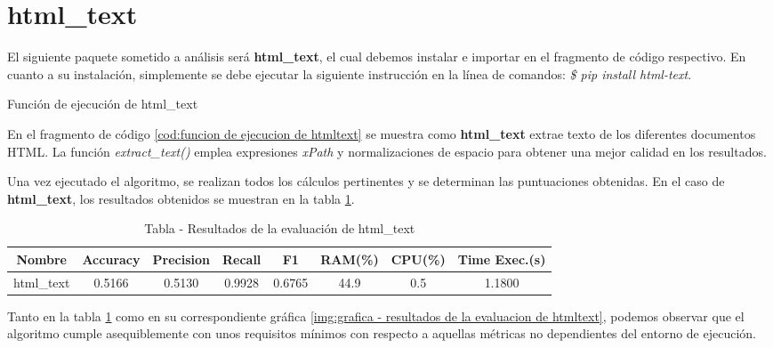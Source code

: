 \section*{html\_text}

El siguiente paquete sometido a análisis será \textbf{html\_text}, el cual debemos instalar e importar en 
el fragmento de código respectivo. En cuanto a su instalación, simplemente se debe ejecutar la siguiente 
instrucción en la línea de comandos: \emph{\$ pip install html-text}.

\begin{codefloat}
    
    \caption{Función de ejecución de html\_text}
    \label{cod:funcion de ejecucion de htmltext}
\end{codefloat}

En el fragmento de código \ref{cod:funcion de ejecucion de htmltext} se muestra como \textbf{html\_text} 
extrae texto de los diferentes documentos HTML. La función \emph{extract\_text()} emplea expresiones 
\emph{xPath} y normalizaciones de espacio para obtener una mejor calidad en los resultados.

Una vez ejecutado el algoritmo, se realizan todos los cálculos pertinentes y se determinan las puntuaciones 
obtenidas. En el caso de \textbf{html\_text}, los resultados obtenidos se muestran en la tabla 
\ref{tab:tabla - resultados de la evaluacion de htmltext}.

\begin{table}[h]
    \begin{center}
      \begin{tabular}{| c | c | c | c | c | c | c | c |} \hline 
       \textbf{Nombre} & \textbf{Accuracy} & \textbf{Precision}  & \textbf{Recall} & \textbf{F1} & \textbf{RAM(\%)} & \textbf{CPU(\%)} & \textbf{Time Exec.(s)} \\ \hline
       html\_text & 0.5166 & 0.5130 & 0.9928 & 0.6765 & 44.9 & 0.5 & 1.1800 \\ \hline
      \end{tabular}
      \caption{Tabla - Resultados de la evaluación de html\_text}
      \label{tab:tabla - resultados de la evaluacion de htmltext}
    \end{center}
\end{table}

Tanto en la tabla \ref{tab:tabla - resultados de la evaluacion de htmltext} como en su correspondiente
gráfica \ref{img:grafica - resultados de la evaluacion de htmltext}, podemos observar que el algoritmo
cumple asequiblemente con unos requisitos mínimos con respecto a aquellas métricas no dependientes del
entorno de ejecución.

